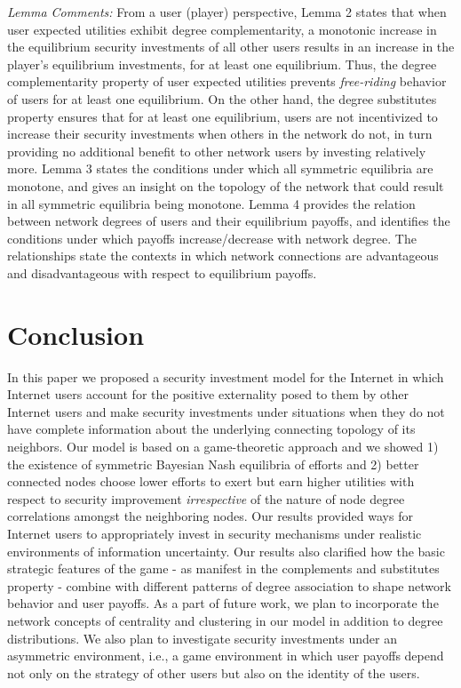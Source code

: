 \documentclass[letterpaper,12pt,onecolumn, nodraft]{IEEEtran}
\begin{document}
\emph{Lemma Comments:} From a user (player) perspective, Lemma 2 states that when user expected utilities exhibit degree complementarity, a monotonic increase in the equilibrium security investments of all other users results in an increase in the player's equilibrium investments, for at least one equilibrium. Thus, the degree complementarity property of user expected utilities prevents \emph{free-riding} behavior of users for at least one equilibrium. On the other hand, the degree substitutes property ensures that for at least one equilibrium, users are not incentivized to increase their security investments when others in the network do not, in turn providing no additional benefit to other network users by investing relatively more. Lemma 3 states the conditions under which all symmetric equilibria are monotone, and gives an insight on the topology of the network that could result in all symmetric equilibria being monotone. Lemma 4 provides the relation between network degrees of users and their equilibrium payoffs, and identifies the conditions under which payoffs increase/decrease with network degree. The relationships state the contexts in which network connections are advantageous and disadvantageous with respect to equilibrium payoffs. 
\section{Conclusion}
In this paper we proposed a security investment model for the Internet in which Internet users account for the positive externality posed to them by other Internet users and make security investments under situations when they do not have complete information about the underlying connecting topology of its neighbors. Our model is based on a game-theoretic approach and we showed 1) the existence of symmetric Bayesian Nash equilibria of efforts and 2) better connected nodes choose lower efforts to exert but earn higher utilities with respect to security improvement \emph{irrespective} of the nature of node degree correlations amongst the neighboring nodes. Our results provided ways for Internet users to appropriately invest in security mechanisms under realistic environments of information uncertainty. Our results also clarified how the basic strategic features of the game - as manifest in the complements and substitutes property - combine with different patterns of degree association to shape network behavior and user payoffs. As a part of future work, we plan to incorporate the network concepts of centrality and clustering in our model in addition to degree distributions. We also plan to investigate security investments under an asymmetric environment, i.e., a game environment in which user payoffs depend not only on the strategy of other users but also on the identity of the users. 

  
\newpage


\end{document}
